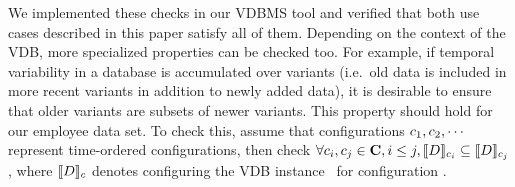 \noindent
%
We implemented these checks in our VDBMS tool and verified that both use cases
described in this paper satisfy all of them. 
%
Depending on the context of the VDB, more specialized properties can be checked
too. For example, if temporal variability in a database is accumulated over
variants (i.e.\ old data is included in more recent variants in addition to
newly added data), it is desirable to ensure that older variants are subsets of
newer variants.
%
This property should hold for our employee data set. To check this, 
assume that configurations \ensuremath{\config_1, \config_2, \cdots}
represent time-ordered configurations, then check
\ensuremath{
\forall \config_i, \config_j \in \confSet, i \le j, \sem[\config_i] {\vDB} \subseteq \sem[\config_j]{\vDB}
}, 
where \ensuremath{\sem[\config]{\vDB}} denotes configuring the VDB instance
\vDB\ for configuration \config. 



